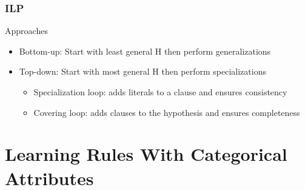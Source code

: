 \documentclass{beamer}
\begin{document}
\begin{frame}
\frametitle{ILP}
Approaches
  \begin{itemize}
   \item Bottom-up: Start with least general H then perform generalizations
   \item Top-down: Start with most general H then perform specializations
   \begin{itemize}
    \item Specialization loop: adds literals to a clause and ensures consistency
    \item Covering loop: adds clauses to the hypothesis and ensures completeness
   \end{itemize}
  \end{itemize}
\end{frame}

\section{Learning Rules With Categorical Attributes}
\end{document}
